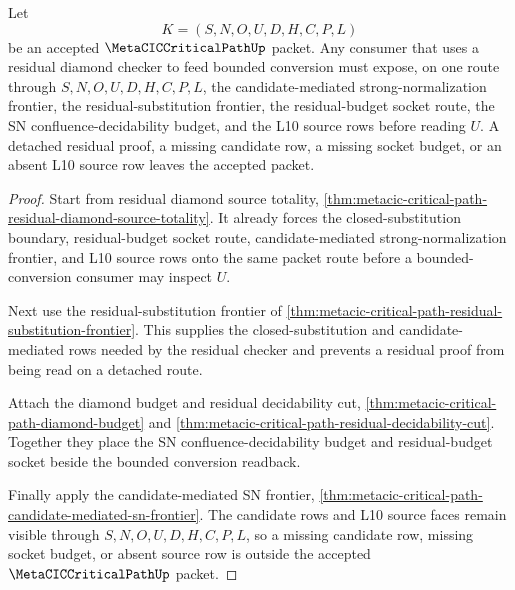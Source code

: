 \begin{theorem}
\label{thm:metacic-critical-path-residual-diamond-candidate-mediated-handoff}
Let
$$
K=(S,N,O,U,D,H,C,P,L)
$$
be an accepted $\MetaCICCriticalPathUp$ packet. Any consumer that uses a residual diamond checker to feed bounded conversion must expose, on one route through $S,N,O,U,D,H,C,P,L$, the candidate-mediated strong-normalization frontier, the residual-substitution frontier, the residual-budget socket route, the SN confluence-decidability budget, and the L10 source rows before reading $U$. A detached residual proof, a missing candidate row, a missing socket budget, or an absent L10 source row leaves the accepted packet.
\end{theorem}
\begin{proof}
Start from residual diamond source totality, \autoref{thm:metacic-critical-path-residual-diamond-source-totality}. It already forces the closed-substitution boundary, residual-budget socket route, candidate-mediated strong-normalization frontier, and L10 source rows onto the same packet route before a bounded-conversion consumer may inspect $U$.

Next use the residual-substitution frontier of \autoref{thm:metacic-critical-path-residual-substitution-frontier}. This supplies the closed-substitution and candidate-mediated rows needed by the residual checker and prevents a residual proof from being read on a detached route.

Attach the diamond budget and residual decidability cut, \autoref{thm:metacic-critical-path-diamond-budget} and \autoref{thm:metacic-critical-path-residual-decidability-cut}. Together they place the SN confluence-decidability budget and residual-budget socket beside the bounded conversion readback.

Finally apply the candidate-mediated SN frontier, \autoref{thm:metacic-critical-path-candidate-mediated-sn-frontier}. The candidate rows and L10 source faces remain visible through $S,N,O,U,D,H,C,P,L$, so a missing candidate row, missing socket budget, or absent source row is outside the accepted $\MetaCICCriticalPathUp$ packet.
\end{proof}

